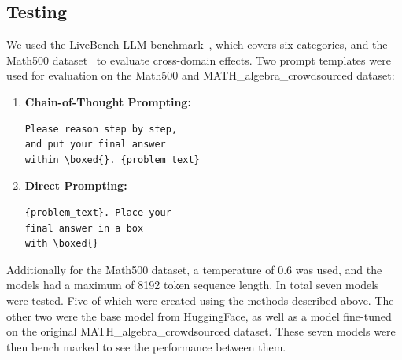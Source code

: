 \documentclass[10.5pt]{article}
\begin{document}
\subsection{Testing}
We used the LiveBench LLM benchmark~\cite{livebench}, which covers six categories, and the Math500 dataset~\cite{lightman2023lets} to evaluate cross-domain effects. Two prompt templates were used for evaluation on the Math500 and MATH\_algebra\_crowdsourced dataset:
\begin{enumerate}
    \item \textbf{Chain-of-Thought Prompting:}
    \begin{verbatim}
Please reason step by step, 
and put your final answer 
within \boxed{}. {problem_text}
    \end{verbatim}
    \item \textbf{Direct Prompting:}
    \begin{verbatim}
{problem_text}. Place your 
final answer in a box 
with \boxed{}
    \end{verbatim}
\end{enumerate}
Additionally for the Math500 dataset, a temperature of 0.6 was used, and the models had a maximum of 8192 token sequence length. In total seven models were tested. Five of which were created using the methods described above. The other two were the base model from HuggingFace, as well as a model fine-tuned on the original MATH\_algebra\_crowdsourced dataset. These seven models were then bench marked to see the performance between them.
\end{document}
